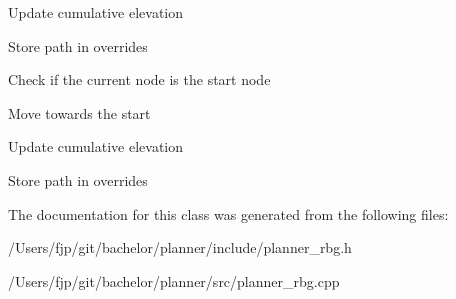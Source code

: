 Update cumulative elevation

Store path in overrides

Check if the current node is the start node

Move towards the start

Update cumulative elevation

Store path in overrides 

The documentation for this class was generated from the following files\+:\begin{DoxyCompactItemize}
\item 
/\+Users/fjp/git/bachelor/planner/include/planner\+\_\+rbg.\+h\item 
/\+Users/fjp/git/bachelor/planner/src/planner\+\_\+rbg.\+cpp\end{DoxyCompactItemize}
